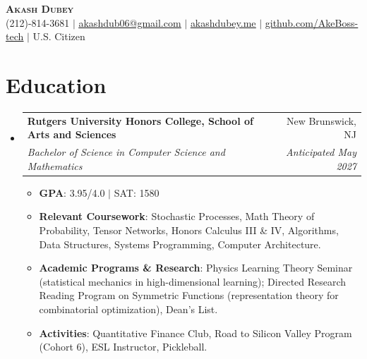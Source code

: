 \documentclass[letterpaper,11pt]{article}
\makeatletter
\newcommand{\resumeItem}[1]{
  \item\small{
    {#1 \vspace{-2pt}}
  }
}
\newcommand{\resumeSubheading}[4]{
  \vspace{-2pt}\item
    \begin{tabular*}{0.97\textwidth}[t]{l@{\extracolsep{\fill}}r}
      \textbf{#1} & #2 \\
      \textit{\small#3} & \textit{\small #4} \\
    \end{tabular*}\vspace{-7pt}
}
\newcommand{\resumeSubHeadingListStart}{\begin{itemize}[leftmargin=0.15in, label={}]}
\newcommand{\resumeSubHeadingListEnd}{\end{itemize}}
\newcommand{\resumeItemListStart}{\begin{itemize}}
\newcommand{\resumeItemListEnd}{\end{itemize}\vspace{-5pt}}
\makeatother
\begin{document}
\begin{center}
    \textbf{\Huge \scshape Akash Dubey} \\ \vspace{1pt}
    \small (212)-814-3681 $|$ \href{mailto:akashdub06@gmail.com}{\underline{akashdub06@gmail.com}} $|$
    \href{https://akashdubey.me/}{\underline{akashdubey.me}} $|$
    \href{https://github.com/AkeBoss-tech}{\underline{github.com/AkeBoss-tech}} $|$
    \small U.S. Citizen
\end{center}
\section{Education}
  \resumeSubHeadingListStart
    \resumeSubheading
      {Rutgers University Honors College, School of Arts and Sciences}{New Brunswick, NJ}
      {Bachelor of Science in Computer Science and Mathematics}{Anticipated May 2027}
      \resumeItemListStart
        \resumeItem{\textbf{GPA}: 3.95/4.0 $|$ SAT: 1580}
        \resumeItem{\textbf{Relevant Coursework}: Stochastic Processes, Math Theory of Probability, Tensor Networks, Honors Calculus III \& IV, Algorithms, Data Structures, Systems Programming, Computer Architecture.}
        \resumeItem{\textbf{Academic Programs \& Research}: Physics Learning Theory Seminar (statistical mechanics in high-dimensional learning); Directed Research Reading Program on Symmetric Functions (representation theory for combinatorial optimization), Dean's List.}
        \resumeItem{\textbf{Activities}: Quantitative Finance Club, Road to Silicon Valley Program (Cohort 6), ESL Instructor, Pickleball.}
      \resumeItemListEnd
  \resumeSubHeadingListEnd
\end{document}
